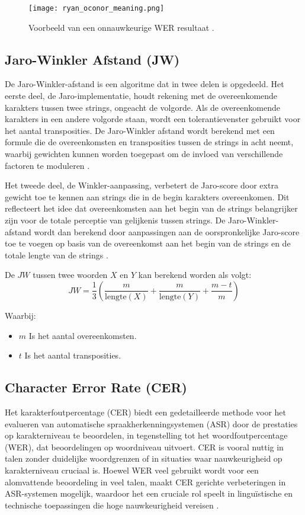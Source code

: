 \begin{figure}[h]
    \centering
    \texttt{[image: ryan\_oconor\_meaning.png]}
    \captionsetup{justification=centering}
    \caption{Voorbeeld van een onnauwkeurige WER resultaat \autocite{OConnor2023}.}
    \label{fig:voorbeeld}
\end{figure}

\subsection{Jaro-Winkler Afstand (JW)}
De Jaro-Winkler-afstand is een algoritme dat in twee delen is opgedeeld. Het eerste deel, de Jaro-implementatie, houdt rekening met de overeenkomende karakters tussen twee strings, ongeacht de volgorde. Als de overeenkomende karakters in een andere volgorde staan, wordt een tolerantievenster gebruikt voor het aantal transposities. De Jaro-Winkler afstand wordt berekend met een formule die de overeenkomsten en transposities tussen de strings in acht neemt, waarbij gewichten kunnen worden toegepast om de invloed van verschillende factoren te moduleren \autocite{Rdazzi2023comparison}.

Het tweede deel, de Winkler-aanpassing, verbetert de Jaro-score door extra gewicht toe te kennen aan strings die in de begin karakters overeenkomen. Dit reflecteert het idee dat overeenkomsten aan het begin van de strings belangrijker zijn voor de totale perceptie van gelijkenis tussen strings. De Jaro-Winkler-afstand wordt dan berekend door aanpassingen aan de oorspronkelijke Jaro-score toe te voegen op basis van de overeenkomst aan het begin van de strings en de totale lengte van de strings \autocite{Rdazzi2023comparison}.

De \(JW\) tussen twee woorden \(X\) en \(Y\) kan berekend worden als volgt:
\begin{equation}
    JW = \frac{1}{3} \left( \frac{m}{\text{lengte}(X)} + \frac{m}{\text{lengte}(Y)} + \frac{m - t}{m} \right)
\end{equation}

Waarbij:
\begin{itemize}
    \item \(m\) Is het aantal overeenkomsten.
    \item \(t\) Is het aantal transposities.
\end{itemize}


\subsection{Character Error Rate (CER)}
Het karakterfoutpercentage (CER) biedt een gedetailleerde methode voor het evalueren van automatische spraakherkenningsystemen (ASR) door de prestaties op karakterniveau te beoordelen, in tegenstelling tot het woordfoutpercentage (WER), dat beoordelingen op woordniveau uitvoert. CER is vooral nuttig in talen zonder duidelijke woordgrenzen of in situaties waar nauwkeurigheid op karakterniveau cruciaal is. 
Hoewel WER veel gebruikt wordt voor een alomvattende beoordeling in veel talen, maakt CER gerichte verbeteringen in ASR-systemen mogelijk, waardoor het een cruciale rol speelt in linguïstische en technische toepassingen die hoge nauwkeurigheid vereisen \autocite{huggingface2023asr}.

